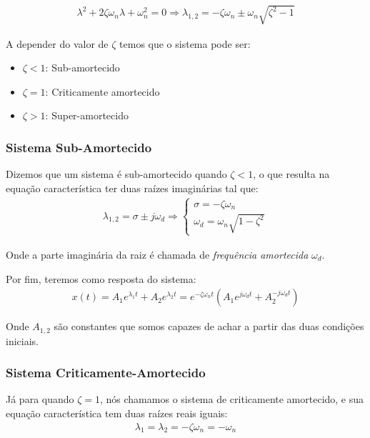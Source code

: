 \documentclass{article}
\begin{document}
\begin{align*}
    \lambda^2 + 2\zeta \omega_n \lambda + \omega_n^2 = 0 \Rightarrow
    \lambda_{1,2} = -\zeta \omega_n \pm \omega_n \sqrt{\zeta^2 - 1}
\end{align*}

A depender do valor de $\zeta$ temos que o sistema pode ser:
\begin{itemize}
    \item $\zeta < 1$: Sub-amortecido
    \item $\zeta=1$: Criticamente amortecido
    \item $\zeta > 1$: Super-amortecido
\end{itemize}

\subsubsection{Sistema Sub-Amortecido}
Dizemos que um sistema é sub-amortecido quando $\zeta < 1$, o que resulta na equação característica ter duas raízes imaginárias tal que:
\begin{align}
    \lambda_{1,2} = \sigma \pm  j \omega_d \Rightarrow \begin{cases}\sigma = -\zeta \omega_n \\ \omega_d = \omega_n \sqrt{1 - \zeta^2}\end{cases}\label{eq:raizes_caso_sub_amortecido}
\end{align}

Onde a parte imaginária da raiz é chamada de \emph{frequência amortecida} $\omega_d$.

Por fim, teremos como resposta do sistema:
\begin{align}
    x(t) = A_1 e^{\lambda_1 t} + A_2 e^{\lambda_2 t} = e^{-\zeta \omega_n t}(A_1e^{j\omega_dt} + A_2^{-j\omega_d t}) \label{eq:resp_sis_sub_amortecido}
\end{align}

Onde $A_{1,2}$ são constantes que somos capazes de achar a partir das duas condições iniciais.

\subsubsection{Sistema Criticamente-Amortecido}
Já para quando $\zeta=1$, nós chamamos o sistema de criticamente amortecido, e sua equação característica tem duas raízes reais iguais:
\begin{align}
    \lambda_1 = \lambda_2 = -\zeta \omega_n = -\omega_n \label{eq:raizes_caso_criticamente_amortecido}
\end{align}
\end{document}
